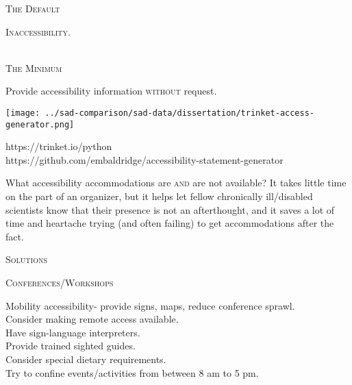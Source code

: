 \documentclass{beamer}
\begin{document}
\begin{center}
\begin{minipage}{0.25\linewidth}
\begin{Large}
\textsc{The Default}
\begin{center}
\textsc{Inaccessibility.}\\
~\\
\end{center}
\end{Large}
\begin{Large}
\textsc{The Minimum}\\
\end{Large}
Provide accessibility information \textsc{without} request.\\
\begin{center}
\texttt{[image: ../sad-comparison/sad-data/dissertation/trinket-access-generator.png]}\\
\begin{small}
https://trinket.io/python\\
https://github.com/embaldridge/accessibility-statement-generator\\
\end{small}
\end{center}
What accessibility accommodations are \textsc{and} are not available?  It takes little time on the part of an organizer, but it helps let fellow chronically ill/disabled scientists know that their presence is not an afterthought, and it saves a lot of time and heartache trying (and often failing) to get accommodations after the fact.
\end{minipage}
\hspace{1cm}
\begin{minipage}{0.42\linewidth}
\vspace{0.5cm}
\begin{Large}
\textsc{Solutions}\\
\end{Large}
\begin{Large}
\textsc{Conferences/Workshops\\}
\end{Large}
Mobility accessibility- provide signs, maps, reduce conference sprawl.\\
Consider making remote access available.\\
Have sign-language interpreters.\\
Provide trained sighted guides.\\
Consider special dietary requirements.\\
Try to confine events/activities from between 8 am to 5 pm.\\


\end{minipage}
\end{center}
\end{document}
